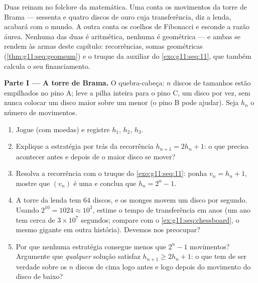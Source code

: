 \begin{problem}
\label{pb:g11:seq:1}
Duas  reinam no folclore da matemática. Uma conta os
movimentos da torre de Brama --- sessenta e quatro discos de ouro
cuja transferência, diz a lenda, acabará com o mundo. A outra conta
os coelhos de Fibonacci e esconde a razão áurea. Nenhuma das duas
é aritmética, nenhuma é geométrica --- e ambas se rendem às armas
deste capítulo: recorrências, somas geométricas
(\cref{thm:g11:seq:geomsum}) e o truque da  auxiliar do
\cref{exo:g11:seq:11}, que também calcula o seu financiamento.

\medskip
\noindent\textbf{Parte I --- A torre de Brama.}
O quebra-cabeça: $n$ discos de tamanhos  estão
empilhados no pino A; leve a pilha inteira para o pino C, um disco
por vez, sem nunca colocar um disco maior sobre um menor (o pino B
pode ajudar). Seja $h_n$ o número  de movimentos.
\begin{enumerate}
  \item Jogue (com moedas) e registre $h_1$, $h_2$, $h_3$.
  \item Explique a estratégia por trás da recorrência
        $h_{n+1} = 2h_n + 1$: o que precisa acontecer antes e
        depois de o maior disco se mover?
  \item Resolva a recorrência com o truque do
        \cref{exo:g11:seq:11}: ponha $v_n = h_n + 1$, mostre que
        $(v_n)$ é uma  e conclua que
        $h_n = 2^n - 1$.
  \item A torre da lenda tem $64$ discos, e os monges movem um
        disco por segundo. Usando $2^{10} = 1024 \approx 10^3$,
        estime o tempo de transferência em anos (um ano tem cerca
        de $3 \times 10^7$ segundos; compare com o
        \cref{ex:g11:seq:chessboard}, o mesmo gigante em outra
        história). Devemos nos preocupar?
  \item Por que nenhuma estratégia consegue menos que $2^n - 1$
        movimentos? Argumente que \emph{qualquer} solução
        satisfaz $h_{n+1} \geq 2 h_n + 1$: o que tem de ser
        verdade sobre os $n$ discos de cima logo antes e logo
        depois do movimento do disco de baixo?
\end{enumerate}


\end{problem}
